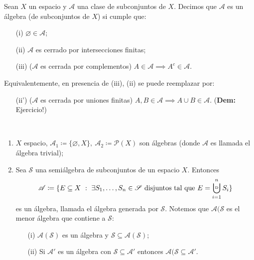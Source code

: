 \documentclass[a4paper]{report}
\newcommand{\bigcupd}{\mathop{\ensurestackMath{\stackinset{l}{}{c}{+.25ex}{\hspace{3pt}{\text{\tiny{D}}}}{\displaystyle{\bigcup}}}}}
\begin{document}
	\begin{definition}[álgebra]
		Sean $X$ un espacio y $\mathscr{A}$ una clase de subconjuntos de $X$. Decimos que $\mathscr{A}$ es un álgebra (de subconjuntos de $X$) si cumple que:
		\begin{enumerate}
			\item[(i)] $\varnothing \in \mathscr{A}$;
			
			\item[(ii)] $\mathscr{A}$ es cerrado por intersecciones finitas;

			\item[(iii)] ($\mathscr{A}$ es cerrada por complementos) $A \in \mathscr{A} \implies A^c \in \mathscr{A}$. 
		\end{enumerate}	
			\noindent Equivalentemente, en presencia de (iii), (ii) se puede reemplazar por:	
		\begin{enumerate}
			\item[(ii')] ($\mathscr{A}$ es cerrada por uniones finitas) $A,B\in \mathscr{A} \implies A \cup B \in \mathscr{A}$. (\textbf{Dem:} Ejercicio!)
		\end{enumerate}
	\end{definition}

	\begin{eg}~
		\begin{enumerate}
			\item $X$ espacio, $\mathscr{A}_1 \coloneq \{\varnothing, X\},\ \mathscr{A}_2 \coloneq \mathcal{P}(X)$ son álgebras (donde $\mathscr{A}$ es llamada el álgebra trivial);

			\item Sea $\mathscr{S}$ una semiálgebra de subconjuntos de un espacio $X$. Entonces 
			\[ \mathscr{A} \coloneq \{ E \subseteq X \ : \ \exists S_1,\dots,S_n \in \mathscr{S} \text{ disjuntos tal que } E = \displaystyle\bigcupd_{i=1}^{n} S_i \} \] 
			es un álgebra, llamada el álgebra generada por $\mathscr{S}$. Notemos que $\mathscr{A}(\mathscr{S}$ es el menor álgebra que contiene a $\mathscr{S}$:
			\begin{enumerate}
				\item[(i)] $\mathscr{A}(\mathscr{S})$ es un álgebra y $\mathscr{S} \subseteq \mathscr{A}(\mathscr{S})$;

				\item[(ii)] Si $\mathscr{A}'$ es un álgebra con $\mathscr{S} \subseteq \mathscr{A}'$ entonces $\mathscr{A}(\mathscr{S} \subseteq \mathscr{A}'$.
			\end{enumerate}
		\end{enumerate}
	\end{eg}
\end{document}
